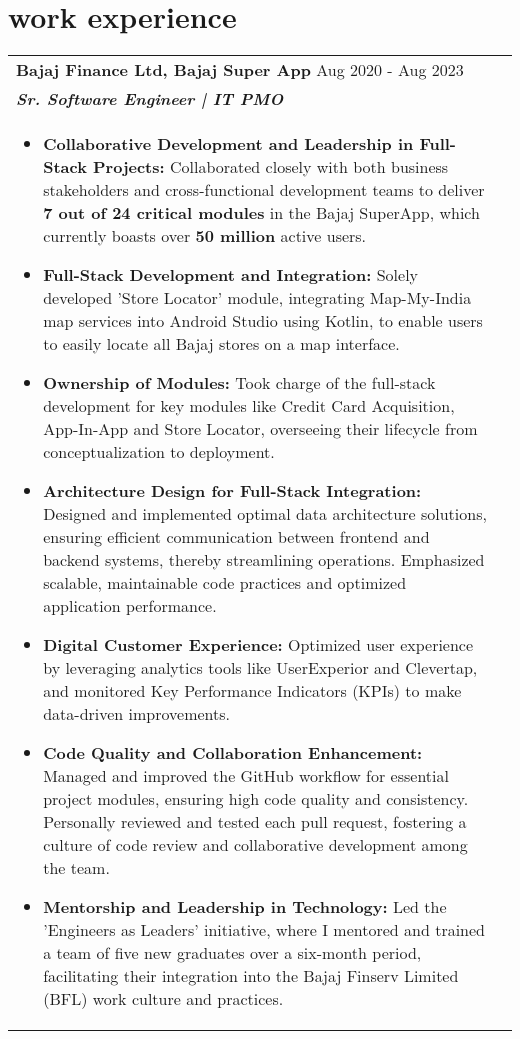 \documentclass[a4paper,8pt]{article}
\begin{document}
\section{work experience}
\begin{tabularx}{\linewidth}{ @{}l r@{} }
\textbf{{Bajaj Finance Ltd, Bajaj Super App}} \hfill \color[HTML]{371e77} Aug 2020 - Aug 2023 \\[4pt]
\color[HTML]{371e77}\textbf{\textit{Sr. Software Engineer | IT PMO}} \color[HTML]{4B28A4} \\[5pt]
\begin{minipage}[t]{\linewidth}
    \begin{itemize}[nosep,after=\strut, leftmargin=2em, itemsep=2pt]
        \item \textbf{Collaborative Development and Leadership in Full-Stack Projects:} Collaborated closely with both business stakeholders and cross-functional development teams to deliver \textbf{7 out of 24 critical modules} in the Bajaj SuperApp, which currently boasts over \textbf{50 million} active users.
        \item \textbf{Full-Stack Development and Integration:} Solely developed 'Store Locator' module, integrating Map-My-India map services into Android Studio using Kotlin, to enable users to easily locate all Bajaj stores on a map interface.
        \item \textbf{Ownership of Modules:} Took charge of the full-stack development for key modules like Credit Card Acquisition, App-In-App and Store Locator, overseeing their lifecycle from conceptualization to deployment.
        \item \textbf{Architecture Design for Full-Stack Integration:} Designed and implemented optimal data architecture solutions, ensuring efficient communication between frontend and backend systems, thereby streamlining operations. Emphasized scalable, maintainable code practices and optimized application performance.
        \item \textbf{Digital Customer Experience:}  Optimized user experience by leveraging analytics tools like UserExperior and Clevertap, and monitored Key Performance Indicators (KPIs) to make data-driven improvements.
        \item \textbf{Code Quality and Collaboration Enhancement:} Managed and improved the GitHub workflow for essential project modules, ensuring high code quality and consistency. Personally reviewed and tested each pull request, fostering a culture of code review and collaborative development among the team.
        \item \textbf{Mentorship and Leadership in Technology:} Led the 'Engineers as Leaders' initiative, where I mentored and trained a team of five new graduates over a six-month period, facilitating their integration into the Bajaj Finserv Limited (BFL) work culture and practices.
    \end{itemize}
\end{minipage}
\end{tabularx}
\end{document}
